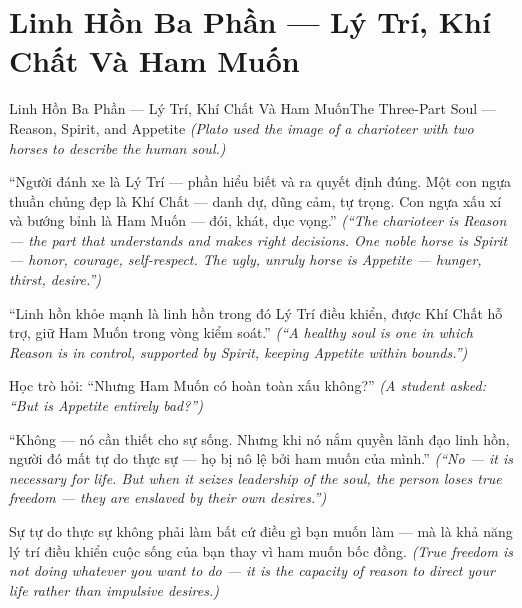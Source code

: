\section{Linh Hồn Ba Phần — Lý Trí, Khí Chất Và Ham Muốn}
\begin{truyen}{Linh Hồn Ba Phần — Lý Trí, Khí Chất Và Ham Muốn}{The Three-Part Soul — Reason, Spirit, and Appetite}
\textit{(Plato used the image of a charioteer with two horses to describe the human soul.)}

``Người đánh xe là Lý Trí — phần hiểu biết và ra quyết định đúng. Một con ngựa thuần chủng đẹp là Khí Chất — danh dự, dũng cảm, tự trọng. Con ngựa xấu xí và bướng bỉnh là Ham Muốn — đói, khát, dục vọng.''
\textit{(``The charioteer is Reason — the part that understands and makes right decisions. One noble horse is Spirit — honor, courage, self-respect. The ugly, unruly horse is Appetite — hunger, thirst, desire.'')}

``Linh hồn khỏe mạnh là linh hồn trong đó Lý Trí điều khiển, được Khí Chất hỗ trợ, giữ Ham Muốn trong vòng kiểm soát.''
\textit{(``A healthy soul is one in which Reason is in control, supported by Spirit, keeping Appetite within bounds.'')}

Học trò hỏi: ``Nhưng Ham Muốn có hoàn toàn xấu không?''
\textit{(A student asked: ``But is Appetite entirely bad?'')}

``Không — nó cần thiết cho sự sống. Nhưng khi nó nắm quyền lãnh đạo linh hồn, người đó mất tự do thực sự — họ bị nô lệ bởi ham muốn của mình.''
\textit{(``No — it is necessary for life. But when it seizes leadership of the soul, the person loses true freedom — they are enslaved by their own desires.'')}

\end{truyen}

\begin{baihoc}
Sự tự do thực sự không phải làm bất cứ điều gì bạn muốn làm — mà là khả năng lý trí điều khiển cuộc sống của bạn thay vì ham muốn bốc đồng.
\textit{(True freedom is not doing whatever you want to do — it is the capacity of reason to direct your life rather than impulsive desires.)}
\end{baihoc}
\ngancach

